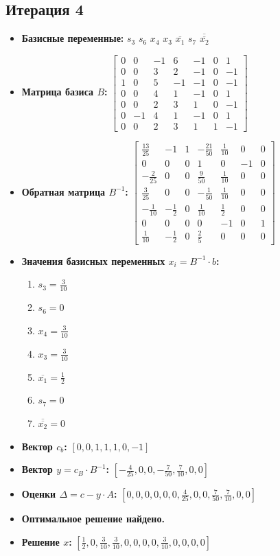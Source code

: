 \begin{itemize}
\subsection*{Итерация 4}
\begin{itemize}
\item \textbf{Базисные переменные:}
$s_3$
$s_6$
$x_4$
$x_3$
$\overline{x_1}$
$s_7$
$\overline{\overline{x_2}}$
\item \textbf{Матрица базиса $B$:}
$\left[\begin{matrix}0 & 0 & -1 & 6 & -1 & 0 & 1\\0 & 0 & 3 & 2 & -1 & 0 & -1\\1 & 0 & 5 & -1 & -1 & 0 & -1\\0 & 0 & 4 & 1 & -1 & 0 & 1\\0 & 0 & 2 & 3 & 1 & 0 & -1\\0 & -1 & 4 & 1 & -1 & 0 & 1\\0 & 0 & 2 & 3 & 1 & 1 & -1\end{matrix}\right]$
\item \textbf{Обратная матрица $B^{-1}$:}
$\left[\begin{matrix}\frac{13}{25} & -1 & 1 & - \frac{21}{50} & \frac{1}{10} & 0 & 0\\0 & 0 & 0 & 1 & 0 & -1 & 0\\- \frac{2}{25} & 0 & 0 & \frac{9}{50} & \frac{1}{10} & 0 & 0\\\frac{3}{25} & 0 & 0 & - \frac{1}{50} & \frac{1}{10} & 0 & 0\\- \frac{1}{10} & - \frac{1}{2} & 0 & \frac{1}{10} & \frac{1}{2} & 0 & 0\\0 & 0 & 0 & 0 & -1 & 0 & 1\\\frac{1}{10} & - \frac{1}{2} & 0 & \frac{2}{5} & 0 & 0 & 0\end{matrix}\right]$
\item \textbf{Значения базисных переменных $ x_i = B^{-1} \cdot b$:}
\begin{enumerate}
\item $s_3 = \frac{3}{10}$
\item $s_6 = 0$
\item $x_4 = \frac{3}{10}$
\item $x_3 = \frac{3}{10}$
\item $\overline{x_1} = \frac{1}{2}$
\item $s_7 = 0$
\item $\overline{\overline{x_2}} = 0$
\end{enumerate}
\item \textbf{Вектор $c_b$:}
$[0, 0, 1, 1, 1, 0, -1]$
\item \textbf{Вектор $y = c_B \cdot B^{-1}$:}
$[- \frac{4}{25}, 0, 0, - \frac{7}{50}, \frac{7}{10}, 0, 0]$
\item \textbf{Оценки $\Delta = c - y \cdot A$:}
$[0, 0, 0, 0, 0, 0, \frac{4}{25}, 0, 0, \frac{7}{50}, \frac{7}{10}, 0, 0]$
\item \textbf{Оптимальное решение найдено.}
\item \textbf{Решение $x$:}
$[\frac{1}{2}, 0, \frac{3}{10}, \frac{3}{10}, 0, 0, 0, 0, \frac{3}{10}, 0, 0, 0, 0]$
\end{itemize}
\end{itemize}
